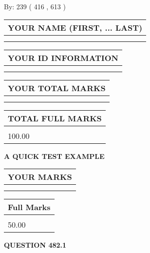 \documentclass[12pt]{article}
\begin{document}
   
\hspace{1.0in} By: 
 239 ( 416 ,  613 )
   
   
   
   
\newpage 
\setcounter{page}{ 
   482001 } 
   
   
   
   
\noindent\begin{tabular}{|l|}
\hline
YOUR NAME (FIRST, ... LAST)  \\
\hline
 \\ 
 \\ 
\hline
\end{tabular}
\hspace{0.05in} \begin{tabular}{|l|}
\hline
 YOUR   ID   INFORMATION  \\
\hline
 \\ 
 \\ 
\hline
\end{tabular}
   
   
\vspace{0.2in}\noindent\begin{tabular}{|l|}
\hline
YOUR TOTAL MARKS  \\
\hline
 \\ 
 \\ 
\hline
\end{tabular}
\hspace{0.05in} \begin{tabular}{|l|}
\hline
TOTAL FULL MARKS  \\
\hline
 \\ 
100.00 \\
\hline
\end{tabular}
   
   
 \vspace{0.2in}
{\LARGE {\textbf{ A QUICK TEST EXAMPLE}}}
   
   
  
\vspace{0.2in}
  
\noindent\begin{tabular}{|l|}
\hline
 YOUR MARKS  \\
\hline
 \\ 
 \\ 
\hline
\end{tabular}
\hspace{0.05in} \begin{tabular}{|l|}
\hline
 Full Marks  \\
\hline
 \\ 
50.00 \\
\hline
\end{tabular}
{\textbf{\Large{QUESTION
482.1 
}}}
  
\end{document}
